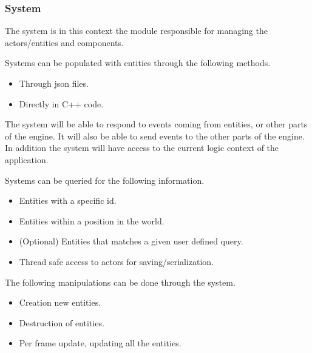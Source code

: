 \subsubsection*{System}
The system is in this context the module responsible for managing the actors/entities and components.

Systems can be populated with entities through the following methods.
\begin{itemize}
    \item
    Through json files.

    \item
    Directly in C++ code.
\end{itemize}

The system will be able to respond to events coming from entities, or other parts of the engine. 
It will also be able to send events to the other parts of the engine.
In addition the system will have access to the current logic context of the application.

Systems can be queried for the following information.
\begin{itemize}
    \item
    Entities with a specific id.

    \item
    Entities within a position in the world.

    \item
    (Optional) Entities that matches a given user defined query.

    \item
    Thread safe access to actors for saving/serialization.
\end{itemize}

The following manipulations can be done through the system.
\begin{itemize}
    \item
    Creation new entities.

    \item
    Destruction of entities.

    \item
    Per frame update, updating all the entities.
\end{itemize}
